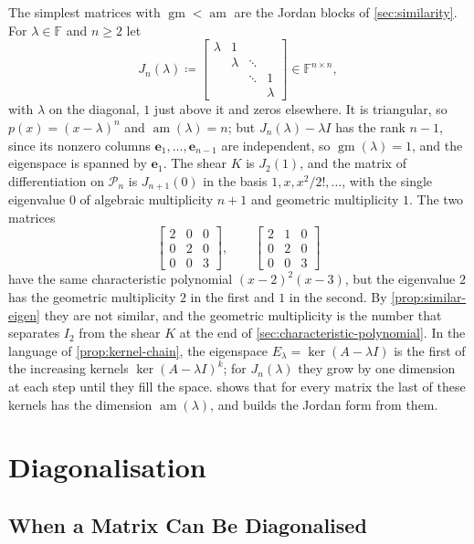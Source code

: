 The simplest matrices with $\operatorname{gm}<\operatorname{am}$ are the Jordan blocks of \cref{sec:similarity}. For $\lambda\in\mathbb F$ and $n\ge2$ let
\[
J_n(\lambda)\coloneqq\begin{bmatrix}\lambda&1&&\\&\lambda&\ddots&\\&&\ddots&1\\&&&\lambda\end{bmatrix}\in\mathbb F^{n\times n},
\]
with $\lambda$ on the diagonal, $1$ just above it and zeros elsewhere. It is triangular, so $p(x)=(x-\lambda)^n$ and $\operatorname{am}(\lambda)=n$; but $J_n(\lambda)-\lambda I$ has the rank $n-1$, since its nonzero columns $\mathbf e_1,\ldots,\mathbf e_{n-1}$ are independent, so $\operatorname{gm}(\lambda)=1$, and the eigenspace is spanned by $\mathbf e_1$. The shear $K$ is $J_2(1)$, and the matrix of differentiation on $\mathcal P_n$ is $J_{n+1}(0)$ in the basis $1,x,x^2/2!,\ldots$, with the single eigenvalue $0$ of algebraic multiplicity $n+1$ and geometric multiplicity $1$. The two matrices
\[
\begin{bmatrix}2&0&0\\0&2&0\\0&0&3\end{bmatrix},\qquad\begin{bmatrix}2&1&0\\0&2&0\\0&0&3\end{bmatrix}
\]
have the same characteristic polynomial $(x-2)^2(x-3)$, but the eigenvalue $2$ has the geometric multiplicity $2$ in the first and $1$ in the second. By \cref{prop:similar-eigen} they are not similar, and the geometric multiplicity is the number that separates $I_2$ from the shear $K$ at the end of \cref{sec:characteristic-polynomial}. In the language of \cref{prop:kernel-chain}, the eigenspace $E_\lambda=\ker(A-\lambda I)$ is the first of the increasing kernels $\ker(A-\lambda I)^k$; for $J_n(\lambda)$ they grow by one dimension at each step until they fill the space.  shows that for every matrix the last of these kernels has the dimension $\operatorname{am}(\lambda)$, and builds the Jordan form from them.

\section{Diagonalisation}
\label{sec:diagonalisation}

\subsection{When a Matrix Can Be Diagonalised}

